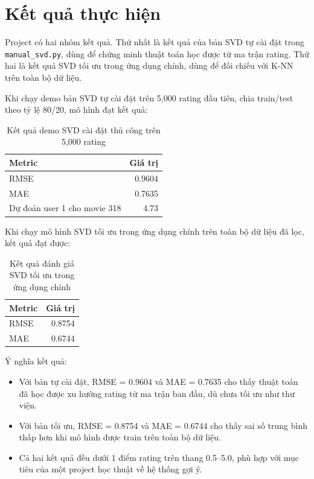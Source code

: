 \documentclass[12pt,a4paper]{article}
\begin{document}
\section{Kết quả thực hiện}

Project có hai nhóm kết quả. Thứ nhất là kết quả của bản SVD tự cài đặt trong \texttt{manual\_svd.py}, dùng để chứng minh thuật toán học được từ ma trận rating. Thứ hai là kết quả SVD tối ưu trong ứng dụng chính, dùng để đối chiếu với K-NN trên toàn bộ dữ liệu.

Khi chạy demo bản SVD tự cài đặt trên 5,000 rating đầu tiên, chia train/test theo tỷ lệ 80/20, mô hình đạt kết quả:

\begin{table}[H]
    \centering
    \begin{tabular}{lr}
        \toprule
        \textbf{Metric} & \textbf{Giá trị} \\
        \midrule
        RMSE & 0.9604 \\
        MAE & 0.7635 \\
        Dự đoán user 1 cho movie 318 & 4.73 \\
        \bottomrule
    \end{tabular}
    \caption{Kết quả demo SVD cài đặt thủ công trên 5,000 rating}
\end{table}

Khi chạy mô hình SVD tối ưu trong ứng dụng chính trên toàn bộ dữ liệu đã lọc, kết quả đạt được:

\begin{table}[H]
    \centering
    \begin{tabular}{lr}
        \toprule
        \textbf{Metric} & \textbf{Giá trị} \\
        \midrule
        RMSE & 0.8754 \\
        MAE & 0.6744 \\
        \bottomrule
    \end{tabular}
    \caption{Kết quả đánh giá SVD tối ưu trong ứng dụng chính}
\end{table}

Ý nghĩa kết quả:

\begin{itemize}
    \item Với bản tự cài đặt, RMSE = 0.9604 và MAE = 0.7635 cho thấy thuật toán đã học được xu hướng rating từ ma trận ban đầu, dù chưa tối ưu như thư viện.
    \item Với bản tối ưu, RMSE = 0.8754 và MAE = 0.6744 cho thấy sai số trung bình thấp hơn khi mô hình được train trên toàn bộ dữ liệu.
    \item Cả hai kết quả đều dưới 1 điểm rating trên thang 0.5--5.0, phù hợp với mục tiêu của một project học thuật về hệ thống gợi ý.
\end{itemize}
\end{document}
